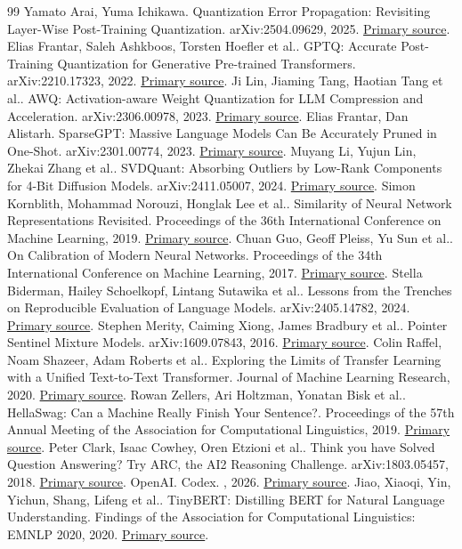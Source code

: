\documentclass[conference]{IEEEtran}
\begin{document}
\begin{thebibliography}{99}
 Yamato Arai, Yuma Ichikawa. Quantization Error Propagation: Revisiting Layer-Wise Post-Training Quantization. arXiv:2504.09629, 2025. \href{https://arxiv.org/abs/2504.09629}{Primary source}.
 Elias Frantar, Saleh Ashkboos, Torsten Hoefler et al.. GPTQ: Accurate Post-Training Quantization for Generative Pre-trained Transformers. arXiv:2210.17323, 2022. \href{https://arxiv.org/abs/2210.17323}{Primary source}.
 Ji Lin, Jiaming Tang, Haotian Tang et al.. AWQ: Activation-aware Weight Quantization for LLM Compression and Acceleration. arXiv:2306.00978, 2023. \href{https://arxiv.org/abs/2306.00978}{Primary source}.
 Elias Frantar, Dan Alistarh. SparseGPT: Massive Language Models Can Be Accurately Pruned in One-Shot. arXiv:2301.00774, 2023. \href{https://arxiv.org/abs/2301.00774}{Primary source}.
 Muyang Li, Yujun Lin, Zhekai Zhang et al.. SVDQuant: Absorbing Outliers by Low-Rank Components for 4-Bit Diffusion Models. arXiv:2411.05007, 2024. \href{https://arxiv.org/abs/2411.05007}{Primary source}.
 Simon Kornblith, Mohammad Norouzi, Honglak Lee et al.. Similarity of Neural Network Representations Revisited. Proceedings of the 36th International Conference on Machine Learning, 2019. \href{https://proceedings.mlr.press/v97/kornblith19a.html}{Primary source}.
 Chuan Guo, Geoff Pleiss, Yu Sun et al.. On Calibration of Modern Neural Networks. Proceedings of the 34th International Conference on Machine Learning, 2017. \href{https://proceedings.mlr.press/v70/guo17a.html}{Primary source}.
 Stella Biderman, Hailey Schoelkopf, Lintang Sutawika et al.. Lessons from the Trenches on Reproducible Evaluation of Language Models. arXiv:2405.14782, 2024. \href{https://arxiv.org/abs/2405.14782}{Primary source}.
 Stephen Merity, Caiming Xiong, James Bradbury et al.. Pointer Sentinel Mixture Models. arXiv:1609.07843, 2016. \href{https://arxiv.org/abs/1609.07843}{Primary source}.
 Colin Raffel, Noam Shazeer, Adam Roberts et al.. Exploring the Limits of Transfer Learning with a Unified Text-to-Text Transformer. Journal of Machine Learning Research, 2020. \href{https://jmlr.org/papers/v21/20-074.html}{Primary source}.
 Rowan Zellers, Ari Holtzman, Yonatan Bisk et al.. HellaSwag: Can a Machine Really Finish Your Sentence?. Proceedings of the 57th Annual Meeting of the Association for Computational Linguistics, 2019. \href{https://aclanthology.org/P19-1472/}{Primary source}.
 Peter Clark, Isaac Cowhey, Oren Etzioni et al.. Think you have Solved Question Answering? Try ARC, the AI2 Reasoning Challenge. arXiv:1803.05457, 2018. \href{https://arxiv.org/abs/1803.05457}{Primary source}.
 OpenAI. Codex. , 2026. \href{https://openai.com/codex/}{Primary source}.
 Jiao, Xiaoqi, Yin, Yichun, Shang, Lifeng et al.. TinyBERT: Distilling BERT for Natural Language Understanding. Findings of the Association for Computational Linguistics: EMNLP 2020, 2020. \href{https://aclanthology.org/2020.findings-emnlp.372/}{Primary source}.
\end{thebibliography}
\end{document}
